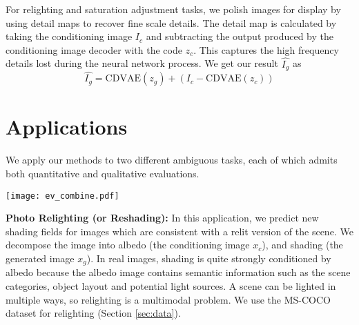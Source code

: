 \documentclass[10pt,twocolumn,letterpaper]{article}
\begin{document}
For relighting and saturation adjustment tasks, we polish images for display by using detail maps to recover fine scale
details. The detail map is calculated by taking the conditioning image $I_c$ and subtracting the output 
produced by the conditioning image decoder with the code $z_{c}$.  This captures the high frequency details 
lost during the neural network process. We get our result $\hat{I_g}$ as
\begin{equation}
\hat{I_g} = \mbox{CDVAE}(z_g) +(I_{c} - \mbox{CDVAE}(z_{c}))
\end{equation}

\section{Applications}
\label{sec:apps}

We apply our methods to two different ambiguous tasks, each of which admits both quantitative 
and qualitative evaluations.

\begin{figure*}[ht]
\centerline{  \texttt{[image: ev\_combine.pdf]}}
  \caption{Comparison to baselines (Section \ref{sec:baseline}) on two tasks: a) photo relighting, b) image resaturation. Vertical axis is 
  error of closest sample to the ground truth, and horizontal axis is variance of predicted samples (bottom right is 
  better).  Both are calculated by sampling 100 outputs from all conditional models. In all tasks, CVAE has low variance for generated results, 
  suggesting the method is poor at producing diverse samples. The nearest neighbor has higher variance but cannot predict samples close to ground-truth
  (higher minimum error). For our CDVAE, the performance increases with 12 MDN gaussian kernals as opposed to 4 and 
  embedding guidance is useful (CDVAE noemb's performance drops). Tables with detailed numbers are in the supplementary materials. CGANs and
  Conditional PixelCNN (CPixel) have higher minimum error, indicating they produce less natural output spatial fields.
}
  \label{fig:ev_combine}
\end{figure*}

{\bf Photo Relighting (or Reshading):} In this application, we predict new shading fields for images which are consistent with a relit
version of the scene.  We decompose the image into albedo (the conditioning image $x_c$), and shading (the generated image $x_g$). 
In real images, shading is quite strongly conditioned by albedo because the albedo image contains semantic information such 
as the scene categories, object layout and potential light sources. A scene can be lighted in multiple ways, so relighting 
is a multimodal problem. We use the MS-COCO dataset for relighting (Section \ref{sec:data}).
\end{document}
